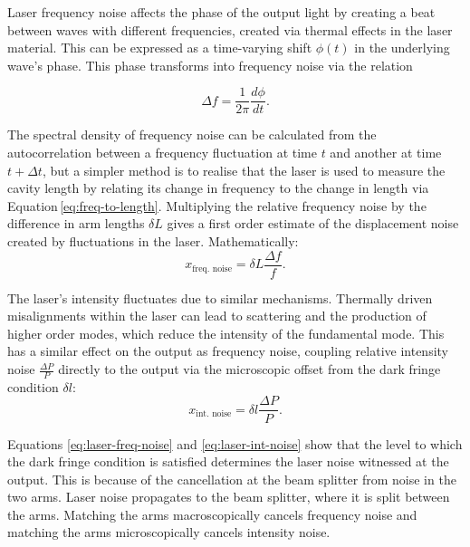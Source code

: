 Laser frequency noise affects the phase of the output light by creating a beat between waves with different frequencies, created via thermal effects in the laser material. This can be expressed as a time-varying shift $\phi \left( t \right)$ in the underlying wave's phase. This phase transforms into frequency noise via the relation

\begin{equation}
  \Delta f = \frac{1}{2 \pi} \frac{d \phi}{dt}.
\end{equation}

The spectral density of frequency noise can be calculated from the autocorrelation between a frequency fluctuation at time $t$ and another at time $t + \Delta t$, but a simpler method is to realise that the laser is used to measure the cavity length by relating its change in frequency to the change in length via Equation\,\ref{eq:freq-to-length}. Multiplying the relative frequency noise by the difference in arm lengths $\delta L$ gives a first order estimate of the displacement noise created by fluctuations in the laser. Mathematically:
\begin{equation}
  \label{eq:laser-freq-noise}
  x_{\text{freq. noise}} = \delta L \frac{\Delta f}{f}.
\end{equation}

The laser's intensity fluctuates due to similar mechanisms. Thermally driven misalignments within the laser can lead to scattering and the production of higher order modes, which reduce the intensity of the fundamental mode. This has a similar effect on the output as frequency noise, coupling relative intensity noise $\frac{\Delta P}{P}$ directly to the output via the microscopic offset from the dark fringe condition $\delta l$:
\begin{equation}
  \label{eq:laser-int-noise}
  x_{\text{int. noise}} = \delta l \frac{\Delta P}{P}.
\end{equation}

Equations \ref{eq:laser-freq-noise} and \ref{eq:laser-int-noise} show that the level to which the dark fringe condition is satisfied determines the laser noise witnessed at the output. This is because of the cancellation at the beam splitter from noise in the two arms. Laser noise propagates to the beam splitter, where it is split between the arms. Matching the arms macroscopically cancels frequency noise and matching the arms microscopically cancels intensity noise.

